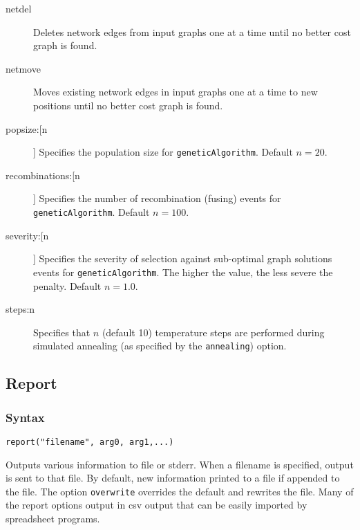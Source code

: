 \begin{description}
		\item[netdel] Deletes network edges from input graphs one at a time until no better cost 
		graph is found.
			
		\item[netmove] Moves existing network edges in input graphs one at a time to new positions 
		until no better cost graph 
		is found.
			
		\item[popsize:[n]] Specifies the population size for \texttt{geneticAlgorithm}. Default $n=20$.
			
		\item[recombinations:[n]] Specifies the number of recombination (fusing) events for 
		\texttt{geneticAlgorithm}. Default $n=100$.
			
		\item[severity:[n]] Specifies the severity of selection against sub-optimal graph solutions events 
		for \texttt{geneticAlgorithm}. The higher the value, the less severe the penalty. Default $n=1.0$.
			
		\item[steps:n] Specifies that $n$ (default 10) temperature steps are performed during simulated 
		annealing (as specified by the \texttt{annealing}) option.
		\end{description}
	
\subsection{Report}
	\subsubsection{Syntax}
		\texttt{report("filename", arg0, arg1,...)}
	
	\begin{phygdescription}
		{Outputs various information to file or stderr. When a filename is specified, output is sent to 
		that file. By default, new information printed to a file if appended to the file. The option 
		\texttt{overwrite} overrides the default and rewrites the file. Many of the report options output in 
		csv output that can be easily imported by spreadsheet programs.}
	\end{phygdescription}
	
